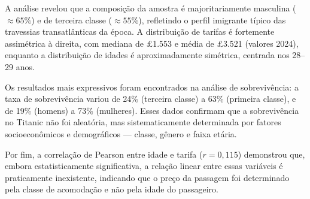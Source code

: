 \documentclass[conference]{IEEEtran}
\begin{document}
A análise revelou que a composição da amostra é majoritariamente masculina
($\approx 65\%$) e de terceira classe ($\approx 55\%$), refletindo o perfil
imigrante típico das travessias transatlânticas da época. A distribuição de
tarifas é fortemente assimétrica à direita, com mediana de £1.553 e média
de £3.521 (valores 2024), enquanto a distribuição de idades é aproximadamente
simétrica, centrada nos 28--29 anos.

Os resultados mais expressivos foram encontrados na análise de sobrevivência:
a taxa de sobrevivência variou de 24\% (terceira classe) a 63\% (primeira
classe), e de 19\% (homens) a 73\% (mulheres). Esses dados confirmam que a
sobrevivência no Titanic não foi aleatória, mas sistematicamente determinada
por fatores socioeconômicos e demográficos — classe, gênero e faixa etária.

Por fim, a correlação de Pearson entre idade e tarifa ($r = 0{,}115$)
demonstrou que, embora estatisticamente significativa, a relação linear entre
essas variáveis é praticamente inexistente, indicando que o preço da
passagem foi determinado pela classe de acomodação e não pela idade do
passageiro.
\end{document}
